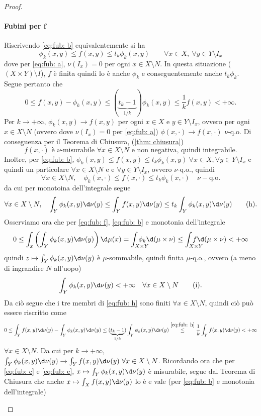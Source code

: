 \begin{proof}
\begin{itemize}
        \paragraph{Fubini per $\boldsymbol f$} Riscrivendo \eqref{eq:fub: b} equivalentemente si ha 
        \[\phi_k(x,y)\leq f(x,y)\leq t_k\phi_k(x,y)\qquad \forall x \in X,\ \forall y\in Y\setminus I_x\]
        dove per \eqref{eq:fub: a}, $\nu(I_x)=0$ per ogni $x\in X\setminus N$. In questa situazione ($(X\times Y)\setminus I$), $f$ è finita quindi lo è anche $\phi_k$ e conseguentemente anche $t_k\phi_k$. Segue pertanto che 
        \[0\leq f(x,y)-\phi_k(x,y) \leq (\underbrace{t_k-1}_{1/k})\phi_k(x,y) \leq \frac{1}{k}f(x,y)<+\infty.\]
        Per $k\to +\infty$, $\phi_{k}(x,y)\to f(x,y)$ per ogni $x\in X$ e $y\in Y\setminus I_x$, ovvero per ogni $x\in X\setminus N$ (ovvero dove $\nu(I_x)=0$ per \eqref{eq:fub: a}) $\phi(x,\cdot)\to f(x,\cdot)$ $\nu$-q.o. Di conseguenza per il Teorema di Chiusura, (\ref{thm: chiusura}) \[\text{$f(x,\cdot)$ è $\nu$-misurabile $\forall x \in X\setminus N$ e non negativa, quindi integrabile.}\tag{g}\label{eq:fub: g}\]
        Inoltre, per \eqref{eq:fub: b}, $\phi_k(x,y)\leq f(x,y)\leq t_k\phi_k(x,y)\ \forall x\in X, \forall y\in Y\setminus I_x$ e quindi un particolare $\forall x \in X\setminus N$ e e $\forall y\in Y\setminus I_x$, ovvero $\nu$-q.o., quindi 
        \[\forall x \in X\setminus N, \quad \phi_k(x,\cdot) \leq f(x,\cdot) \leq t_k\phi_k(x,\cdot)\quad \nu-\text{q.o.}\]
        da cui per monotoina dell'integrale segue 
        \[\forall x \in X\setminus N, \quad\int_Y\phi_k(x,y)\d\nu(y)\leq \int_Yf(x,y)\d\nu(y)\leq t_k\int_Y\phi_k(x,y) \d\nu(y) \tag{h}\label{eq:fub: h}.\]
        Osserviamo ora che per \eqref{eq:fub: f}, \eqref{eq:fub: b} e monotonia dell'integrale
        \[0 \leq \int_x\left(\int_Y\phi_k(x,y)\d\nu(y)\right)\d\mu(x) = \int_{X\times Y}\!\!\!\!\!\!\!\!\!\!\phi_k\d(\mu\times \nu) \leq \int_{X\times Y}\!\!\!\!\!\!\!\!\!\!f\d(\mu\times \nu) < +\infty\]
        quindi $z\mapsto \int_Y\phi_k(x,y)\d\nu(y)$ è $\mu$-sommabile, quindi finita $\mu$-q.o., ovvero (a meno di ingrandire $N$ all'uopo) 
        \[\int_Y\phi_k(x,y)\d\nu(y)<+\infty\quad \forall x \in X\setminus N\tag{i}\label{eq:fub: i}.\]
        Da ciò segue che i tre membri di \eqref{eq:fub: h} sono finiti $\forall x\in X\setminus N$, quindi ciò può essere riscritto come
        \[0\leq \int_Yf(x,y)\d\nu(y)-\int_Y\phi_k(x,y)\d\nu(y)\leq (\underbrace{t_k-1}_{1/k})\int_Y\phi_k(x,y) \d\nu(y) \overset{\eqref{eq:fub: h}}{\leq} \frac{1}{k}\int_Yf(x,y)\d\nu(y)< +\infty\]
        $\forall x \in X\setminus N$. Da cui per $k\to +\infty$, $\int_{Y}\phi_k(x,y)\d\nu(y)\to \int_{Y}f(x,y)\d\nu(y)\ \forall x\in X\setminus N$. Ricordando ora che per \eqref{eq:fub: c} e \eqref{eq:fub: e}, $x\mapsto \int_{Y}\phi_k(x,y)\d\nu(y)$ è misurabile, segue dal Teorema di Chiusura che anche $x\mapsto \int_{X}f(x,y)\d\nu(y)$ lo è e vale (per \eqref{eq:fub: b} e monotonia dell'integrale)

\end{itemize}
\end{proof}
